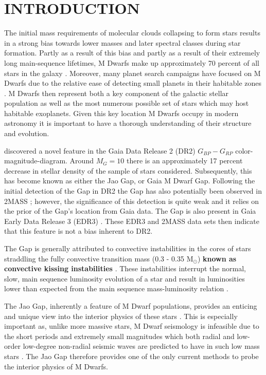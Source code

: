\section{INTRODUCTION}\label{sec:intro}
The initial mass requirements of molecular clouds collapsing to form stars
results in a strong bias towards lower masses and later spectral classes
during star formation. Partly as a result of this bias and partly as a result
of their extremely long main-sequence lifetimes, M Dwarfs make up approximately
70 percent of all stars in the galaxy \citep{Winters2019}. Moreover, many
planet search campaigns have focused on M Dwarfs due to the relative ease of
detecting small planets in their habitable zones \citep[e.g.][]{Nut08}. M
Dwarfs then represent both a key component of the galactic stellar population
as well as the most numerous possible set of stars which may host habitable
exoplanets. Given this key location M Dwarfs occupy in modern astronomy it is
important to have a thorough understanding of their structure and evolution.

\citet{Jao2018} discovered a novel feature in the Gaia Data Release 2 (DR2)
$G_{BP}-G_{RP}$ color-magnitude-diagram. Around $M_{G}=10$ there is an
approximately 17 percent decrease in stellar density of the sample of stars
\citet{Jao2018} considered. Subsequently, this has become known as either the
Jao Gap, or Gaia M Dwarf Gap. Following the initial detection of the Gap in DR2
the Gap has also potentially been observed in 2MASS \citep{Skrutskie2006,
Jao2018}; however, the significance of this detection is quite weak and it
relies on the prior of the Gap's location from Gaia data. The Gap is
also present in Gaia Early Data Release 3 (EDR3) \citep{Jao2021}. These EDR3
and 2MASS data sets then indicate that this feature is not a bias inherent to
DR2.

The Gap is generally attributed to convective instabilities in the cores of
stars straddling the fully convective transition mass (0.3 - 0.35 M$_{\odot}$)
\textbf{known as convective kissing instabilities} \citep{Baraffe2018}. These
instabilities interrupt the normal, slow, main sequence luminosity evolution of
a star and result in luminosities lower than expected from the main sequence
mass-luminosity relation \citep{Jao2020}.

The Jao Gap, inherently a feature of M Dwarf populations, provides an enticing
and unique view into the interior physics of these stars \citep{Feiden2021}.
This is especially important as, unlike more massive stars, M Dwarf seismology
is infeasible due to the short periods and extremely small
magnitudes which both radial and low-order low-degree non-radial seismic waves
are predicted to have in such low mass stars \citep{Rodriguez-Lopez2019}. The
Jao Gap therefore provides one of the only current methods to probe the
interior physics of M Dwarfs.


